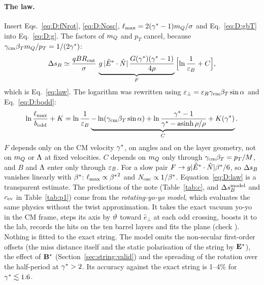 \paragraph{The law.} Insert Eqs.~\eqref{eq:D:fNrot}, \eqref{eq:D:Nosc}, $\ell_{\max}=2(\gamma^*-1)m_Q/\sigma$ and
Eq.~\eqref{eq:D:gbT} into Eq.~\eqref{eq:D:g}. The factors of $m_Q$ and $p_T$ cancel, because $\gamma_{\rm cm}\beta_Tm_Q/p_T=1/(2\gamma^*)$:
\begin{equation}
  \Delta s_B\simeq\frac{qBR_{\rm out}}{\sigma}\,
  \underbrace{g\,|\hat E^*\cdot\hat N|\,\frac{G(\gamma^*)(\gamma^*-1)}{4\rho}}_{F}\,
  \Bigl[\ln\frac{1}{\varepsilon_B}+C\Bigr],
  \label{eq:D:law}
\end{equation}
which is Eq.~\eqref{eq:law}. The logarithm was rewritten using $\varepsilon_\perp=\varepsilon_B\gamma_{\rm cm}\beta_T\sin\alpha$ and
Eq.~\eqref{eq:D:bodd}:
\begin{equation}
  \ln\frac{\ell_{\max}}{b_{\rm odd}}+K=\ln\frac1{\varepsilon_B}
  \underbrace{-\ln(\gamma_{\rm cm}\beta_T\sin\alpha)+\ln\frac{\gamma^*-1}{\gamma^*-\operatorname{asinh}\rho/\rho}+K(\gamma^*)}_{C}.
  \label{eq:D:C}
\end{equation}
$F$ depends only on the CM velocity $\gamma^*$, on angles and on the layer geometry, not on $m_Q$ or $\Lambda$ at fixed
velocities. $C$ depends on $m_Q$ only through $\gamma_{\rm cm}\beta_T=p_T/M$, and $B$ and $\Lambda$ enter only through
$\varepsilon_B$. For a slow pair $F\to g|\hat E^*\cdot\hat N|\beta^*/6$, so $\Delta s_B$ vanishes linearly with $\beta^*$: $\ell_{\max}\propto{\beta^*}^2$
and $N_{\rm osc}\propto1/\beta^*$. Equation~\eqref{eq:D:law} is a transparent estimate. The predictions of the note (Table~\ref{tab:c},
and $\Delta s_B^{\rm model}$ and $c_{\rm ev}$ in Table~\ref{tab:p1}) come from the \emph{rotating-yo-yo model}, which evaluates the same physics without the
twist approximation. It takes the exact vacuum yo-yo in the CM frame, steps its axis by $\vartheta$ toward $\hat e_\perp$ at
each odd crossing, boosts it to the lab, records the hits on the ten barrel layers and fits the plane (check ).
Nothing is fitted to the exact string. The model omits the non-secular first-order offsets (the miss distance itself and
the static polarisation of the string by $\mathbf{E}^*$), the effect of $\mathbf{B}^*$ (Section~\ref{sec:string:valid}) and the
spreading of the rotation over the half-period at $\gamma^*>2$. Its accuracy against the exact string is 1--4\% for
$\gamma^*\lesssim1.6$.

